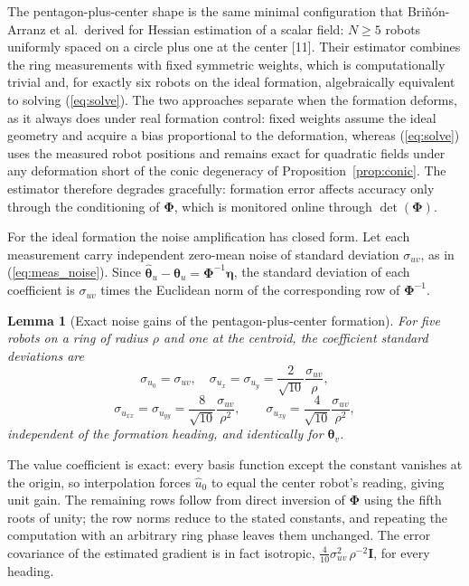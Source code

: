 \documentclass[lettersize,journal]{IEEEtran}
\newtheorem{lemma}{Lemma}
\begin{document}
The pentagon-plus-center shape is the same minimal configuration that
Bri\~{n}\'{o}n-Arranz et al.\ derived for Hessian estimation of a scalar
field: $N \geq 5$ robots uniformly spaced on a circle plus one at the
center [11]. Their estimator combines the ring measurements with fixed
symmetric weights, which is computationally trivial and, for exactly six
robots on the ideal formation, algebraically equivalent to solving
(\ref{eq:solve}). The two approaches separate when the formation deforms,
as it always does under real formation control: fixed weights assume the
ideal geometry and acquire a bias proportional to the deformation,
whereas (\ref{eq:solve}) uses the measured robot positions and remains
exact for quadratic fields under any deformation short of the conic
degeneracy of Proposition~\ref{prop:conic}. The estimator therefore
degrades gracefully: formation error affects accuracy only through the
conditioning of $\boldsymbol{\Phi}$, which is monitored online through
$\det(\boldsymbol{\Phi})$.

For the ideal formation the noise amplification has closed form. Let each
measurement carry independent zero-mean noise of standard deviation
$\sigma_{uv}$, as in (\ref{eq:meas_noise}). Since
$\hat{\boldsymbol{\theta}}_u - \boldsymbol{\theta}_u =
\boldsymbol{\Phi}^{-1}\boldsymbol{\eta}$, the standard deviation of each
coefficient is $\sigma_{uv}$ times the Euclidean norm of the
corresponding row of $\boldsymbol{\Phi}^{-1}$.

\begin{lemma}[Exact noise gains of the pentagon-plus-center formation]
\label{lem:gains}
For five robots on a ring of radius $\rho$ and one at the centroid, the
coefficient standard deviations are
\begin{equation}
    \sigma_{u_0} = \sigma_{uv}, \quad
    \sigma_{u_x} = \sigma_{u_y} = \frac{2}{\sqrt{10}}\frac{\sigma_{uv}}{\rho},
    \label{eq:gain_grad}
\end{equation}
\begin{equation}
    \sigma_{u_{xx}} = \sigma_{u_{yy}} = \frac{8}{\sqrt{10}}
    \frac{\sigma_{uv}}{\rho^2},
    \qquad
    \sigma_{u_{xy}} = \frac{4}{\sqrt{10}}\frac{\sigma_{uv}}{\rho^2},
    \label{eq:gain_hess}
\end{equation}
independent of the formation heading, and identically for
$\boldsymbol{\theta}_v$.
\end{lemma}

\begin{IEEEproof}
The value coefficient is exact: every basis function except the constant
vanishes at the origin, so interpolation forces $\hat{u}_0$ to equal the
center robot's reading, giving unit gain. The remaining rows follow from
direct inversion of $\boldsymbol{\Phi}$ using the fifth roots of unity;
the row norms reduce to the stated constants, and repeating the
computation with an arbitrary ring phase leaves them unchanged. The
error covariance of the estimated gradient is in fact isotropic,
$\tfrac{4}{10}\sigma_{uv}^2\,\rho^{-2}\mathbf{I}$, for every heading.
\end{IEEEproof}
\end{document}
